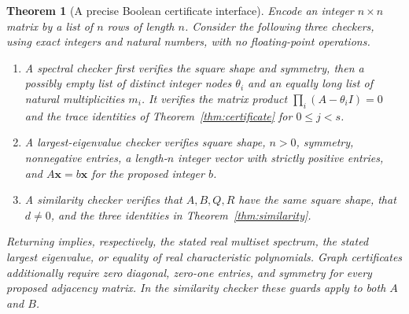 \documentclass[11pt]{article}
\newcommand\Zx{{\mathbf x}}
\newtheorem{theorem}{Theorem}[section]
\theoremstyle{definition}
\newcommand{\code}[1]{\ifmmode\text{\small\nolinkurl{#1}}\else{\small\nolinkurl{#1}}\fi}
\begin{document}
\begin{theorem}[A precise Boolean certificate interface]\label{thm:checker}
Encode an integer $n\times n$ matrix by a list of $n$ rows of length
$n$. Consider the following three checkers, using exact integers and
natural numbers, with no floating-point operations.
\begin{enumerate}
\item A spectral checker first verifies the square shape and symmetry,
then a possibly empty list of distinct integer nodes $\theta_i$ and an
equally long list of natural multiplicities $m_i$. It verifies the
matrix product $\prod_i(A-\theta_iI)=0$ and the trace identities
of Theorem~\ref{thm:certificate} for $0\le j<s$.
\item A largest-eigenvalue checker verifies square shape, $n>0$,
symmetry, nonnegative entries, a length-$n$ integer vector with
strictly positive entries, and $A\Zx=b\Zx$ for the proposed integer $b$.
\item A similarity checker verifies that $A,B,Q,R$ have the same
square shape, that $d\ne0$, and the three identities in
Theorem~\ref{thm:similarity}.
\end{enumerate}
Returning \code{true} implies, respectively, the stated real multiset
spectrum, the stated largest eigenvalue, or equality of real
characteristic polynomials. Graph certificates additionally require zero
diagonal, zero-one entries, and symmetry for every proposed adjacency
matrix. In the similarity checker these guards apply to both $A$ and $B$.
\end{theorem}
\end{document}
